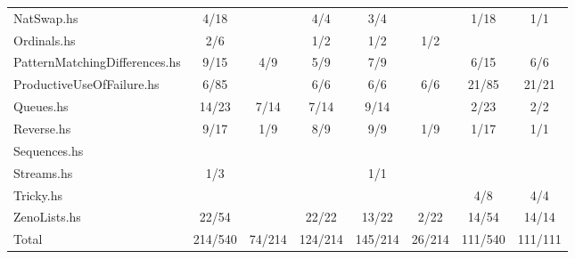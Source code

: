 \documentclass{article}
\begin{document}
\begin{longtable}{l || c | c | c | c | c || c | c}
NatSwap.hs                    & 4/18 &  & 4/4 & 3/4 &  & 1/18 & 1/1\\
Ordinals.hs                   & 2/6 &  & 1/2 & 1/2 & 1/2 &  & \\
PatternMatchingDifferences.hs & 9/15 & 4/9 & 5/9 & 7/9 &  & 6/15 & 6/6\\
ProductiveUseOfFailure.hs     & 6/85 &  & 6/6 & 6/6 & 6/6 & 21/85 & 21/21\\
Queues.hs                     & 14/23 & 7/14 & 7/14 & 9/14 &  & 2/23 & 2/2\\
Reverse.hs                    & 9/17 & 1/9 & 8/9 & 9/9 & 1/9 & 1/17 & 1/1\\
Sequences.hs                  &  &  &  &  &  &  & \\
Streams.hs                    & 1/3 &  &  & 1/1 &  &  & \\
Tricky.hs                     &  &  &  &  &  & 4/8 & 4/4\\
ZenoLists.hs                  & 22/54 &  & 22/22 & 13/22 & 2/22 & 14/54 & 14/14\\
Total                         & 214/540 & 74/214 & 124/214 & 145/214 & 26/214 & 111/540 & 111/111\\

\end{longtable}
\end{document}
